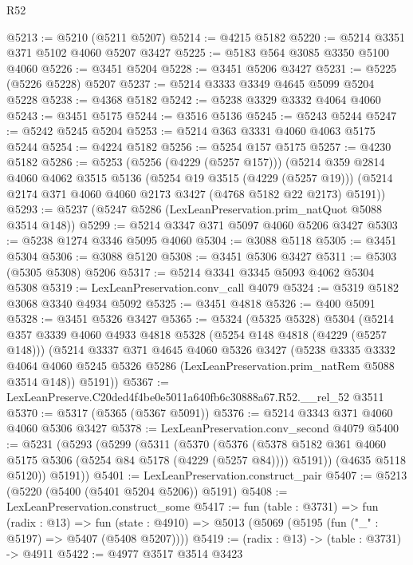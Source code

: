 \begin{lexlean}{R52}
\begin{coremodule}
@5213 := @5210 (@5211 @5207)
@5214 := @4215 @5182
@5220 := @5214 @3351 @371 @5102 @4060 @5207 @3427
@5225 := @5183 @564 @3085 @3350 @5100 @4060
@5226 := @3451 @5204
@5228 := @3451 @5206 @3427
@5231 := @5225 (@5226 @5228) @5207
@5237 := @5214 @3333 @3349 @4645 @5099 @5204 @5228
@5238 := @4368 @5182
@5242 := @5238 @3329 @3332 @4064 @4060
@5243 := @3451 @5175
@5244 := @3516 @5136
@5245 := @5243 @5244
@5247 := @5242 @5245 @5204
@5253 := @5214 @363 @3331 @4060 @4063 @5175 @5244
@5254 := @4224 @5182
@5256 := @5254 @157 @5175
@5257 := @4230 @5182
@5286 := @5253
    (@5256 (@4229 (@5257 @157)))
    (@5214
      @359
      @2814
      @4060
      @4062
      @3515
      @5136
      (@5254 @19 @3515 (@4229 (@5257 @19)))
      (@5214 @2174 @371 @4060 @4060 @2173 @3427 (@4768 @5182 @22 @2173) @5191))
@5293 := @5237 (@5247 @5286 (LexLeanPreservation.prim_natQuot @5088 @3514 @148))
@5299 := @5214 @3347 @371 @5097 @4060 @5206 @3427
@5303 := @5238 @1274 @3346 @5095 @4060
@5304 := @3088 @5118
@5305 := @3451 @5304
@5306 := @3088 @5120
@5308 := @3451 @5306 @3427
@5311 := @5303 (@5305 @5308) @5206
@5317 := @5214 @3341 @3345 @5093 @4062 @5304 @5308
@5319 := LexLeanPreservation.conv_call @4079
@5324 := @5319 @5182 @3068 @3340 @4934 @5092
@5325 := @3451 @4818
@5326 := @400 @5091
@5328 := @3451 @5326 @3427
@5365 := @5324
    (@5325 @5328)
    @5304
    (@5214
      @357
      @3339
      @4060
      @4933
      @4818
      @5328
      (@5254 @148 @4818 (@4229 (@5257 @148)))
      (@5214
        @3337
        @371
        @4645
        @4060
        @5326
        @3427
        (@5238
          @3335
          @3332
          @4064
          @4060
          @5245
          @5326
          @5286
          (LexLeanPreservation.prim_natRem @5088 @3514 @148))
        @5191))
@5367 := LexLeanPreserve.C20ded4f4be0e5011a640fb6c30888a67.R52.__rel_52 @3511
@5370 := @5317 (@5365 (@5367 @5091))
@5376 := @5214 @3343 @371 @4060 @4060 @5306 @3427
@5378 := LexLeanPreservation.conv_second @4079
@5400 := @5231
    (@5293
      (@5299
        (@5311
          (@5370
            (@5376
              (@5378 @5182 @361 @4060 @5175 @5306 (@5254 @84 @5178 (@4229 (@5257 @84))))
              @5191))
          (@4635 @5118 @5120))
        @5191))
@5401 := LexLeanPreservation.construct_pair
@5407 := @5213 (@5220 (@5400 (@5401 @5204 @5206)) @5191)
@5408 := LexLeanPreservation.construct_some
@5417 := fun (table : @3731) =>
  fun (radix : @13) =>
  fun (state : @4910) => @5013 (@5069 (@5195 (fun ("_" : @5197) => @5407 (@5408 @5207))))
@5419 := (radix : @13) -> (table : @3731) -> @4911
@5422 := @4977 @3517 @3514 @3423

\end{coremodule}
\end{lexlean}
